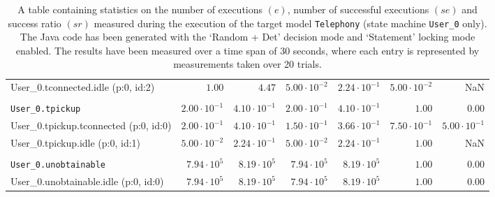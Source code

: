 \begin{table}[htbp]
{\begin{tabular}{lrrrrrr}
\hspace{3mm}User\_0.tconnected.idle (p:0, id:2)       &               $1.00$ &               $4.47$ & $5.00 \cdot 10^{-2}$ & $2.24 \cdot 10^{-1}$ & $5.00 \cdot 10^{-2}$ &                  NaN \\
\\[-8pt]\texttt{User\_0.tpickup}                      & $2.00 \cdot 10^{-1}$ & $4.10 \cdot 10^{-1}$ & $2.00 \cdot 10^{-1}$ & $4.10 \cdot 10^{-1}$ &               $1.00$ &               $0.00$ \\
\hspace{3mm}User\_0.tpickup.tconnected (p:0, id:0)    & $2.00 \cdot 10^{-1}$ & $4.10 \cdot 10^{-1}$ & $1.50 \cdot 10^{-1}$ & $3.66 \cdot 10^{-1}$ & $7.50 \cdot 10^{-1}$ & $5.00 \cdot 10^{-1}$ \\
\hspace{3mm}User\_0.tpickup.idle (p:0, id:1)          & $5.00 \cdot 10^{-2}$ & $2.24 \cdot 10^{-1}$ & $5.00 \cdot 10^{-2}$ & $2.24 \cdot 10^{-1}$ &               $1.00$ &                  NaN \\
\\[-8pt]\texttt{User\_0.unobtainable}                 &  $7.94 \cdot 10^{5}$ &  $8.19 \cdot 10^{5}$ &  $7.94 \cdot 10^{5}$ &  $8.19 \cdot 10^{5}$ &               $1.00$ &               $0.00$ \\
\hspace{3mm}User\_0.unobtainable.idle (p:0, id:0)     &  $7.94 \cdot 10^{5}$ &  $8.19 \cdot 10^{5}$ &  $7.94 \cdot 10^{5}$ &  $8.19 \cdot 10^{5}$ &               $1.00$ &               $0.00$ \\
\bottomrule
\end{tabular}
}
\caption{A table containing statistics on the number of executions $(e)$, number of successful executions $(se)$ and success ratio $(sr)$ measured during the execution of the target model \texttt{Telephony} (state machine \texttt{User\_0} only). The Java code has been generated with the `Random + Det' decision mode and `Statement' locking mode enabled. The results have been measured over a time span of 30 seconds, where each entry is represented by measurements taken over 20 trials.}
\label{table:frequency_results_telephony_random_det_statement_user_0}
\end{table}